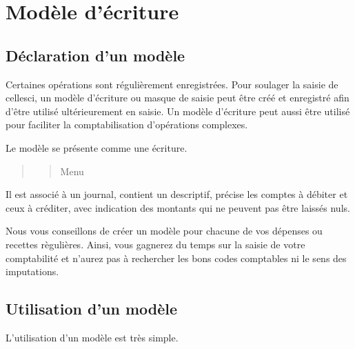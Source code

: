\documentclass[a4paper,10pt,oneside,french]{sphinxmanual}
\begin{document}
\sphinxstepscope


\section{Modèle d’écriture}
\label{\detokenize{accounting/model:modele-d-ecriture}}\label{\detokenize{accounting/model::doc}}

\subsection{Déclaration d’un modèle}
\label{\detokenize{accounting/model:declaration-d-un-modele}}
\sphinxAtStartPar
Certaines opérations sont régulièrement enregistrées. Pour soulager la saisie de celles\sphinxhyphen{}ci, un modèle d’écriture ou masque de saisie peut être créé et enregistré afin d’être utilisé ultérieurement en saisie.
Un modèle d’écriture peut aussi être utilisé pour faciliter la comptabilisation d’opérations complexes.

\sphinxAtStartPar
Le modèle se présente comme une écriture.
\begin{quote}
\begin{quote}

\sphinxAtStartPar
Menu 
\end{quote}

\noindent{}
\end{quote}

\sphinxAtStartPar
Il est associé à un journal, contient un descriptif, précise les comptes à débiter et ceux à créditer, avec indication des montants qui ne peuvent pas être laissés nuls.
\begin{quote}

\noindent{}
\end{quote}

\sphinxAtStartPar
Nous vous conseillons de créer un modèle pour chacune de vos dépenses ou recettes règulières. Ainsi, vous gagnerez du temps sur la saisie de votre comptabilité et n’aurez pas à rechercher les bons codes comptables ni le sens des imputations.


\subsection{Utilisation d’un modèle}
\label{\detokenize{accounting/model:utilisation-d-un-modele}}
\sphinxAtStartPar
L’utilisation d’un modèle est très simple.
\end{document}
